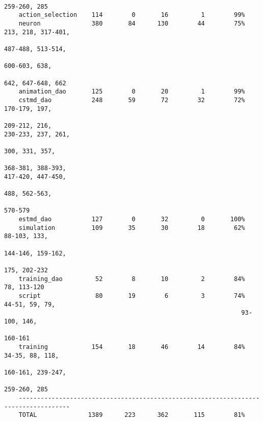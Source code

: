 \documentclass[a4paper,11pt]{article}
\begin{document}
\begin{verbatim}
                                                                     259-260, 285
    action_selection    114        0       16         1        99%   
    neuron              380       84      130        44        75%   213, 218, 317-401,
                                                                     487-488, 513-514,
                                                                     600-603, 638,
                                                                     642, 647-648, 662
    animation_dao       125        0       20         1        99%   
    cstmd_dao           248       59       72        32        72%   170-179, 197,
                                                                     209-212, 216,                                                                                      	                                                                 230-233, 237, 261,
                                                                     300, 331, 357, 
                                                                     368-381, 388-393,                                                                                     	                                                                 417-420, 447-450,
                                                                     488, 562-563,
                                                                     570-579
    estmd_dao           127        0       32         0       100%   
    simulation          109       35       30        18        62%   88-103, 133, 
                                                                     144-146, 159-162, 
                                                                     175, 202-232
    training_dao         52        8       10         2        84%   78, 113-120
    script               80       19        6         3        74%   44-51, 59, 79, 
    	                                                         93-100, 146,
                                                                     160-161
    training            154       18       46        14        84%   34-35, 88, 118, 
                                                                     160-161, 239-247,
                                                                     259-260, 285                                                                     
    ------------------------------------------------------------------------------------
    TOTAL              1389      223      362       115        81%  
    \end{verbatim}
    
\end{document}
